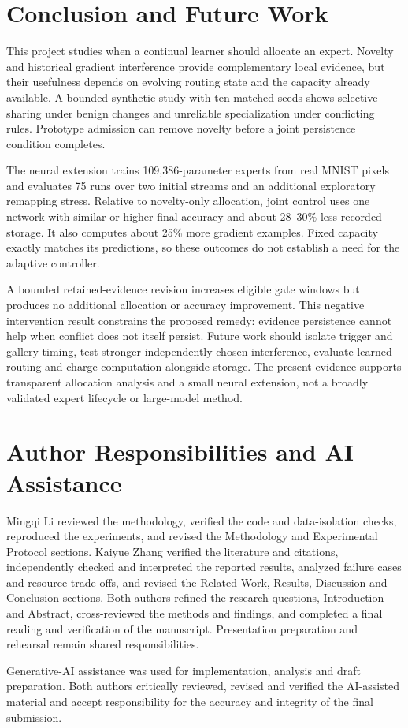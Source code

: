 \balance
\section{Conclusion and Future Work}
This project studies when a continual learner should allocate an expert. Novelty and historical gradient interference provide complementary local evidence, but their usefulness depends on evolving routing state and the capacity already available. A bounded synthetic study with ten matched seeds shows selective sharing under benign changes and unreliable specialization under conflicting rules. Prototype admission can remove novelty before a joint persistence condition completes.

The neural extension trains 109,386-parameter experts from real MNIST pixels and evaluates 75 runs over two initial streams and an additional exploratory remapping stress. Relative to novelty-only allocation, joint control uses one network with similar or higher final accuracy and about 28--30\% less recorded storage. It also computes about 25\% more gradient examples. Fixed capacity exactly matches its predictions, so these outcomes do not establish a need for the adaptive controller.

A bounded retained-evidence revision increases eligible gate windows but produces no additional allocation or accuracy improvement. This negative intervention result constrains the proposed remedy: evidence persistence cannot help when conflict does not itself persist. Future work should isolate trigger and gallery timing, test stronger independently chosen interference, evaluate learned routing and charge computation alongside storage. The present evidence supports transparent allocation analysis and a small neural extension, not a broadly validated expert lifecycle or large-model method.

\section*{Author Responsibilities and AI Assistance}
Mingqi Li reviewed the methodology, verified the code and data-isolation checks, reproduced the experiments, and revised the Methodology and Experimental Protocol sections. Kaiyue Zhang verified the literature and citations, independently checked and interpreted the reported results, analyzed failure cases and resource trade-offs, and revised the Related Work, Results, Discussion and Conclusion sections. Both authors refined the research questions, Introduction and Abstract, cross-reviewed the methods and findings, and completed a final reading and verification of the manuscript. Presentation preparation and rehearsal remain shared responsibilities.

Generative-AI assistance was used for implementation, analysis and draft preparation. Both authors critically reviewed, revised and verified the AI-assisted material and accept responsibility for the accuracy and integrity of the final submission.
